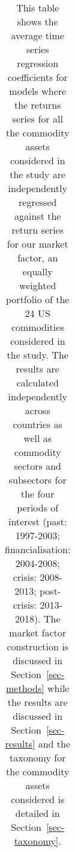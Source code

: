 \documentclass[
  authoryear,
  preprint,
  3p]{elsarticle}
\begin{document}
\begin{longtable}[t]{>{}l>{}l>{}l>{}r>{}r>{}r>{}r}

\caption{\label{tbl-regressions-index}This table shows the average time
series regression coefficients for models where the returns series for
all the commodity assets considered in the study are independently
regressed against the return series for our market factor, an equally
weighted portfolio of the 24 US commodities considered in the study. The
results are calculated independently across countries as well as
commodity sectors and subsectors for the four periods of interest (past:
1997-2003; financialisation: 2004-2008; crisis: 2008-2013; post-crisis:
2013-2018). The market factor construction is discussed in
Section~\ref{sec-methods} while the results are discussed in
Section~\ref{sec-results} and the taxonomy for the commodity assets
considered is detailed in Section~\ref{sec-taxonomy}.}

\tabularnewline


\end{longtable}
\end{document}
